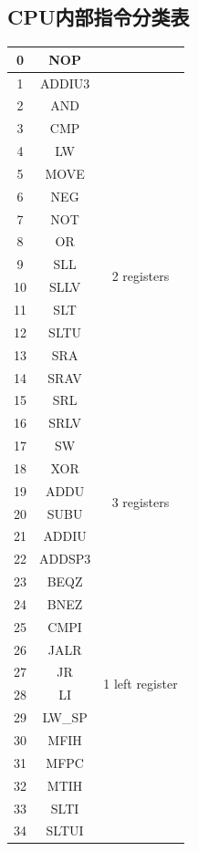 \documentclass[10pt]{article}
\begin{document}
\begin{CJK}{UTF8}{gbsn}
\subsection{CPU内部指令分类表}
\begin{center}
\begin{tabular}{|c|c|c|}\hline
0&	NOP & \\\hline
1&	ADDIU3 & \multirow{18}{*}{2 registers}\\\cline{1-2}
2&	AND&\\\cline{1-2}
3&	CMP&\\\cline{1-2}
4&	LW&\\\cline{1-2}
5&	MOVE&\\\cline{1-2}
6&	NEG&\\\cline{1-2}
7&	NOT&\\\cline{1-2}
8&	OR&\\\cline{1-2}
9&	SLL&\\\cline{1-2}
10&	SLLV&\\\cline{1-2}
11&	SLT&\\\cline{1-2}
12&	SLTU&\\\cline{1-2}
13&	SRA&\\\cline{1-2}
14&	SRAV&\\\cline{1-2}
15&	SRL&\\\cline{1-2}
16&	SRLV&\\\cline{1-2}
17&	SW&\\\cline{1-2}
18&	XOR&\\\hline
19&	ADDU & \multirow{2}{*}{3 registers}\\\cline{1-2}
20&	SUBU&\\\hline
21&	ADDIU & \multirow{15}{*}{1 left register}\\\cline{1-2}
22&	ADDSP3&\\\cline{1-2}
23&	BEQZ&\\\cline{1-2}
24&	BNEZ&\\\cline{1-2}
25&	CMPI&\\\cline{1-2}
26&	JALR&\\\cline{1-2}
27&	JR&\\\cline{1-2}
28&	LI&\\\cline{1-2}
29&	LW\_SP&\\\cline{1-2}
30&	MFIH&\\\cline{1-2}
31&	MFPC&\\\cline{1-2}
32&	MTIH&\\\cline{1-2}
33&	SLTI&\\\cline{1-2}
34&	SLTUI&\\\cline{1-2}

\end{tabular}
\end{center}
\end{CJK}
\end{document}
